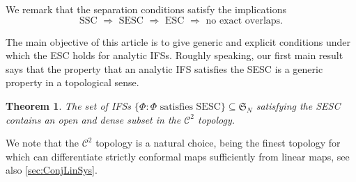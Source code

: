 \documentclass[12pt,]{article}
\def\cref#1{\ref{#1}}%
\newtheorem{theorem}{Theorem}[section]
\theoremstyle{definition}
\theoremstyle{remark}
\newcommand{\0}{\mathbf{0}}
\begin{document}
{We remark that the separation conditions satisfy the implications 
\[
  \text{SSC $\Rightarrow$ SESC $\Rightarrow$ ESC
  $\Rightarrow$ no exact overlaps.} 
\]



The main objective of this article is to give generic and explicit conditions under which the
ESC holds for analytic IFSs. Roughly speaking, our first
main result says that the property that an analytic IFS satisfies the SESC is a generic property in
a topological sense.

\begin{theorem}\label{thm:ESCOpenDense}
  The set of IFSs $\{\Phi \colon \Phi\text{ satisfies SESC}\}\subseteq \mathfrak{S}_N$ satisfying the
  SESC contains an open and
  dense subset in the $\mathcal{C}^2$ topology.
\end{theorem}
We note that the $\mathcal{C}^2$ topology is a natural choice, being the finest topology for which
can differentiate strictly conformal maps sufficiently from linear maps, see also
\cref{sec:ConjLinSys}.

}
\end{document}
